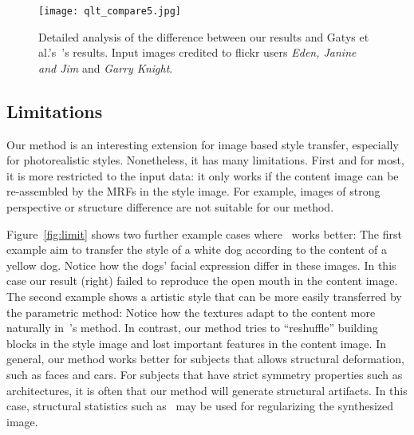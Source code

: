 \documentclass[10pt,twocolumn,letterpaper]{article}
\begin{document}

\begin{figure*}[ht]
	\centering
	\texttt{[image: qlt\_compare5.jpg]}
	\caption{Detailed analysis of the difference between our results and Gatys et al.'s~\cite{Gatys15}'s results. Input images credited to flickr users \emph{Eden, Janine and Jim} and \emph{Garry Knight}.}\label{fig:qlt_compare3}
\end{figure*}


%

\subsection{Limitations}
Our method is an interesting extension for image based style transfer, especially for photorealistic styles. Nonetheless, it has many limitations. First and for most, it is more restricted to the input data: it only works if the content image can be re-assembled by the MRFs in the style image. For example, images of strong perspective or structure difference are not suitable for our method. 

Figure~\ref{fig:limit} shows two further example cases where~\cite{Gatys15} works better: The first example aim to transfer the style of a white dog according to the content of a yellow dog. Notice how the dogs' facial expression differ in these images. In this case our result (right) failed to reproduce the open mouth in the content image. The second example shows a artistic style that can be more easily transferred by the parametric method: Notice how the textures adapt to the content more naturally in~\cite{Gatys15}'s method. In contrast, our method tries to ``reshuffle'' building blocks in the style image and lost important features in the content image. In general, our method works better for subjects that allows structural deformation, such as faces and cars. For subjects that have strict symmetry properties such as architectures, it is often that our method will generate structural artifacts. In this case, structural statistics such as~\cite{He12} may be used for regularizing the synthesized image.
\end{document}
